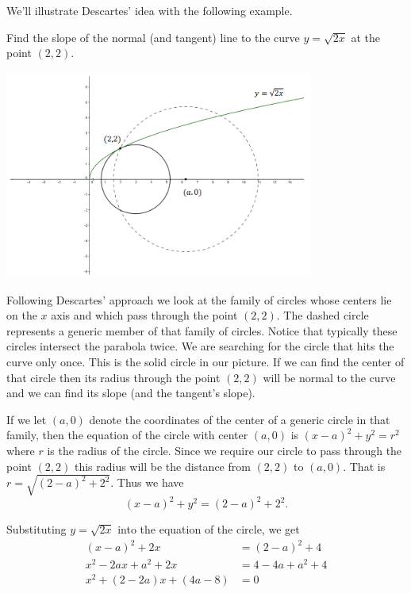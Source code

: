 We'll illustrate Descartes' idea with the following example.

\begin{myexample}
Find the slope of the normal (and tangent) line to the curve $y=\sqrt{2x}$ at the
point $(2,2).$

\centerline{\includegraphics*[height=2.7in,width=4in]{Figures/DescartesCircle}}


Following Descartes' approach we look at the family of circles whose
centers lie on the $x$ axis and which pass through the point $(2,2).$
The dashed circle represents a generic member of that family of
circles.  Notice that typically these circles intersect the parabola twice.  We
are searching for the circle that hits the curve only once.  This is
the solid circle in our picture.  If we can find the center of that
circle then its radius through the point $(2,2)$ will be normal to the curve and we can find its
slope (and the tangent's slope).


If we let $(a,0)$ denote the coordinates of the center of a generic circle in that
family, then the equation of the circle with center $(a,0)$ is
$(x-a)^2+y^2=r^2$ where $r$ is the radius of the circle. Since we
require our circle to pass through the point $(2,2)$ this radius will
be the distance from $(2,2)$ to $(a,0).$ That is
$r=\sqrt{(2-a)^2+2^2}.$
Thus we have
$$
(x-a)^2+y^2=(2-a)^2+2^2.
$$

Substituting $y=\sqrt{2x}$ into the equation of the circle, we get
\begin{align*}
  (x-a)^2+2x&=(2-a)^2+4\\
  x^2-2ax+a^2+2x&=4-4a+a^2+4\\
  x^2+(2-2a)x+(4a-8)&=0
\end{align*}


\end{myexample}
